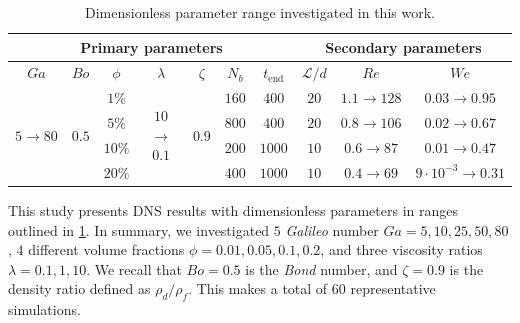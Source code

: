\begin{table}[h!]
    \centering
    \caption{Dimensionless parameter range investigated in this work.}
    \begin{tabular}{|ccccccc|ccc|}
        \hline
        \multicolumn{7}{|c}{Primary parameters} & \multicolumn{3}{||c|}{Secondary parameters}\\ \hline
        \multicolumn{1}{|c|}{$Ga$}                               & \multicolumn{1}{c|}{$Bo$}                   & \multicolumn{1}{c|}{$\phi$} & \multicolumn{1}{c|}{$\lambda$}                    & \multicolumn{1}{c|}{$\zeta$}                & \multicolumn{1}{c|}{$N_b$} & $t_\text{end}$ & \multicolumn{1}{||c|}{$\mathcal{L}/d$} & \multicolumn{1}{c|}{$Re$}  & $We$   \\ \hline
        \multicolumn{1}{|c|}{\multirow{4}{*}{$5\rightarrow 80$}} & \multicolumn{1}{c|}{\multirow{4}{*}{$0.5$}} & \multicolumn{1}{c|}{$1\%$}  & \multicolumn{1}{c|}{\multirow{4}{*}{$10$ $\to$ $0.1$}} & \multicolumn{1}{c|}{\multirow{4}{*}{$0.9$}} & \multicolumn{1}{c|}{$160$} & $400$           & \multicolumn{1}{||c|}{$20$}            & \multicolumn{1}{c|}{$1.1\to 128$} & {$0.03\to 0.95$} \\ 
        \multicolumn{1}{|c|}{}                                   & \multicolumn{1}{c|}{}                       & \multicolumn{1}{c|}{$5\%$}  & \multicolumn{1}{c|}{}                             & \multicolumn{1}{c|}{}                       & \multicolumn{1}{c|}{$800$} & $400$           & \multicolumn{1}{||c|}{$20$}            & \multicolumn{1}{c|}{$0.8\to 106$} &  {$0.02\to 0.67$}\\ 
        \multicolumn{1}{|c|}{}                                   & \multicolumn{1}{c|}{}                       & \multicolumn{1}{c|}{$10\%$} & \multicolumn{1}{c|}{}                             & \multicolumn{1}{c|}{}                       & \multicolumn{1}{c|}{$200$} & $1000$           & \multicolumn{1}{||c|}{$10$}            & \multicolumn{1}{c|}{$0.6\to 87$}&  {$0.01\to 0.47$}\\ 
        \multicolumn{1}{|c|}{}                                   & \multicolumn{1}{c|}{}                       & \multicolumn{1}{c|}{$20\%$} & \multicolumn{1}{c|}{}                             & \multicolumn{1}{c|}{}                       & \multicolumn{1}{c|}{$400$} & $1000$           & \multicolumn{1}{||c|}{$10$}            & \multicolumn{1}{c|}{$0.4\to 69$}&  {$9\cdot 10^{-3}\to 0.31$}\\ \hline
        \end{tabular}
    \label{tab:simulations}
\end{table}
This study presents DNS results with dimensionless parameters in ranges outlined in \ref{tab:simulations}.
In summary, we investigated $5$ \textit{Galileo} number $Ga = 5,10,25,50,80$, $4$ different volume fractions $\phi = 0.01,0.05,0.1,0.2$, and three viscosity ratios $\lambda =0.1,1,10$. 
We recall that $Bo = 0.5$ is the \textit{Bond} number, and $\zeta = 0.9$ is the density ratio defined as $\rho_d/\rho_f$.
This makes a total of $60$ representative simulations.



